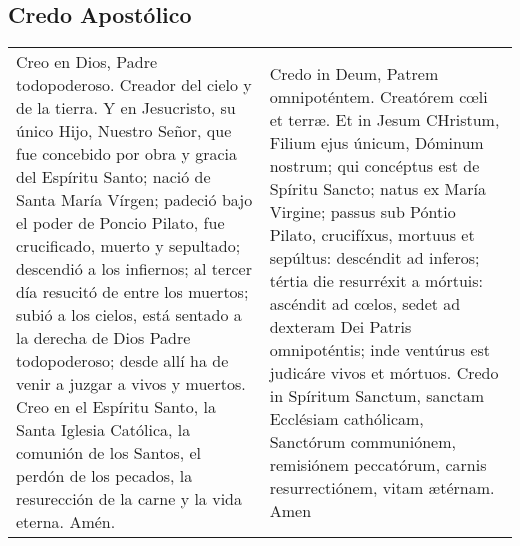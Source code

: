 \documentclass[./devocionario.tex]{subfiles}
\begin{document}
    \subsection*{Credo Apostólico}
    \begin{longtable} { p{} p{} }
        Creo en Dios, Padre todopoderoso. Creador del cielo y de la tierra. Y en Jesucristo, su único Hijo, Nuestro Señor, 
        que fue concebido por obra y gracia del Espíritu Santo; nació de Santa María Vírgen; padeció bajo el poder de Poncio Pilato, 
        fue crucificado, muerto y sepultado; descendió a los infiernos; al tercer día resucitó de entre los muertos; subió a los cielos, 
        está sentado a la derecha de Dios Padre todopoderoso; desde allí ha de venir a juzgar a vivos y muertos. 
        Creo en el Espíritu Santo, la Santa Iglesia Católica, la comunión de los Santos, el perdón de los pecados, 
        la resurección de la carne y la vida eterna. Amén.

        &

        Credo in Deum, Patrem omnipoténtem. Creatórem cœli et terræ. Et in Jesum CHristum, Filium ejus únicum, Dóminum nostrum; 
        qui concéptus est de Spíritu Sancto; natus ex María Virgine; passus sub Póntio Pilato, crucifíxus, mortuus et sepúltus: 
        descéndit ad inferos; tértia die resurréxit a mórtuis: ascéndit ad cœlos, sedet ad dexteram Dei Patris omnipoténtis; 
        inde ventúrus est judicáre vivos et mórtuos. Credo in Spíritum Sanctum, sanctam Ecclésiam cathólicam, Sanctórum communiónem, 
        remisiónem peccatórum, carnis resurrectiónem, vitam ætérnam. Amen
    \end{longtable}
\end{document}
